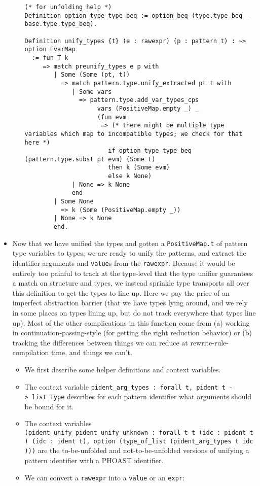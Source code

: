 \begin{itemize}
\begin{itemize}
\begin{verbatim}
(* for unfolding help *)
Definition option_type_type_beq := option_beq (type.type_beq _ base.type.type_beq).

Definition unify_types {t} (e : rawexpr) (p : pattern t) : ~> option EvarMap
  := fun T k
     => match preunify_types e p with
        | Some (Some (pt, t))
          => match pattern.type.unify_extracted pt t with
             | Some vars
               => pattern.type.add_var_types_cps
                    vars (PositiveMap.empty _) _
                    (fun evm
                     => (* there might be multiple type variables which map to incompatible types; we check for that here *)
                       if option_type_type_beq (pattern.type.subst pt evm) (Some t)
                       then k (Some evm)
                       else k None)
             | None => k None
             end
        | Some None
          => k (Some (PositiveMap.empty _))
        | None => k None
        end.
\end{verbatim}
  \end{itemize}
\item
  Now that we have unified the types and gotten a \texttt{PositiveMap.t}
  of pattern type variables to types, we are ready to unify the
  patterns, and extract the identifier arguments and \texttt{value}s
  from the \texttt{rawexpr}. Because it would be entirely too painful to
  track at the type-level that the type unifier guarantees a match on
  structure and types, we instead sprinkle type transports all over this
  definition to get the types to line up. Here we pay the price of an
  imperfect abstraction barrier (that we have types lying around, and we
  rely in some places on types lining up, but do not track everywhere
  that types line up). Most of the other complications in this function
  come from (a) working in continuation-passing-style (for getting the
  right reduction behavior) or (b) tracking the differences between
  things we can reduce at rewrite-rule-compilation time, and things we
  can't.

  \begin{itemize}
  \item
    We first describe some helper definitions and context variables.
  \item
    The context variable
    \texttt{pident\_arg\_types\ :\ forall\ t,\ pident\ t\ -\textgreater{}\ list\ Type}
    describes for each pattern identifier what arguments should be bound
    for it.
  \item
    The context variables
    \texttt{(pident\_unify\ pident\_unify\_unknown\ :\ forall\ t\ t\textquotesingle{}\ (idc\ :\ pident\ t)\ (idc\textquotesingle{}\ :\ ident\ t\textquotesingle{}),\ option\ (type\_of\_list\ (pident\_arg\_types\ t\ idc)))}
    are the to-be-unfolded and not-to-be-unfolded versions of unifying a
    pattern identifier with a PHOAST identifier.
  \item
    We can convert a \texttt{rawexpr} into a \texttt{value} or an
    \texttt{expr}:


\end{itemize}
\end{itemize}

